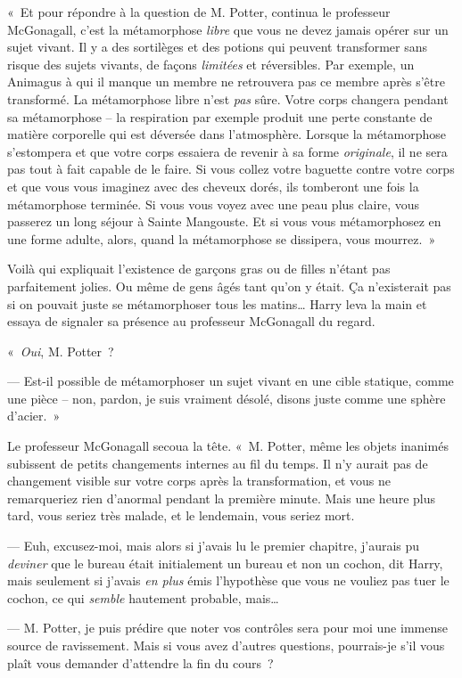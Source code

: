 «~Et pour répondre à la question de M. Potter, continua le professeur McGonagall, c'est la métamorphose \emph{libre} que vous ne devez jamais opérer sur un sujet vivant. Il y a des sortilèges et des potions qui peuvent transformer sans risque des sujets vivants, de façons \emph{limitées} et réversibles. Par exemple, un Animagus à qui il manque un membre ne retrouvera pas ce membre après s'être transformé. La métamorphose libre n'est \emph{pas} sûre. Votre corps changera pendant sa métamorphose -- la respiration par exemple produit une perte constante de matière corporelle qui est déversée dans l'atmosphère. Lorsque la métamorphose s'estompera et que votre corps essaiera de revenir à sa forme \emph{originale}, il ne sera pas tout à fait capable de le faire. Si vous collez votre baguette contre votre corps et que vous vous imaginez avec des cheveux dorés, ils tomberont une fois la métamorphose terminée. Si vous vous voyez avec une peau plus claire, vous passerez un long séjour à Sainte Mangouste. Et si vous vous métamorphosez en une forme adulte, alors, quand la métamorphose se dissipera, vous mourrez.~»

Voilà qui expliquait l'existence de garçons gras ou de filles n'étant pas parfaitement jolies. Ou même de gens âgés tant qu'on y était. Ça n'existerait pas si on pouvait juste se métamorphoser tous les matins… Harry leva la main et essaya de signaler sa présence au professeur McGonagall du regard.

«~\emph{Oui}, M. Potter~?

--- Est-il possible de métamorphoser un sujet vivant en une cible statique, comme une pièce -- non, pardon, je suis vraiment désolé, disons juste comme une sphère d'acier.~»

Le professeur McGonagall secoua la tête. «~M. Potter, même les objets inanimés subissent de petits changements internes au fil du temps. Il n'y aurait pas de changement visible sur votre corps après la transformation, et vous ne remarqueriez rien d'anormal pendant la première minute. Mais une heure plus tard, vous seriez très malade, et le lendemain, vous seriez mort.

--- Euh, excusez-moi, mais alors si j'avais lu le premier chapitre, j'aurais pu \emph{deviner} que le bureau était initialement un bureau et non un cochon, dit Harry, mais seulement si j'avais \emph{en plus} émis l'hypothèse que vous ne vouliez pas tuer le cochon, ce qui \emph{semble} hautement probable, mais…

--- M. Potter, je puis prédire que noter vos contrôles sera pour moi une immense source de ravissement. Mais si vous avez d'autres questions, pourrais-je s'il vous plaît vous demander d'attendre la fin du cours~?


